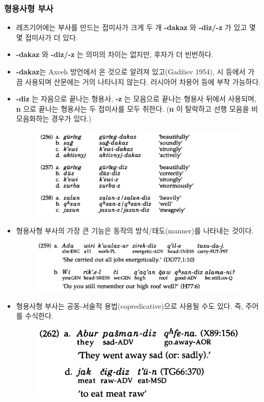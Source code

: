 \subsubsection{형용사형 부사}
\begin{itemize}
\item 레즈기어에는 부사를 만드는 접미사가 크게 두 개 \textbf{-dakaz} 와 \textbf{-diz/-z} 가 있고 몇몇 접미사가 더 있다.
\item \textbf{-dakaz} 와  \textbf{-diz/-z} 는 의미의 차이는 없지만, 후자가 더 빈번하다. 
\item \textbf{-dakaz}는 Axceh 방언에서 온 것으로 알려져 있고(Gadžiev 1954), 시 등에서 가끔 사용되며 산문에는 거의 나타나지 않는다. 러시아어 차용어 등에 부착 가능하다.
\item \textbf{-diz} 는 자음으로 끝나는 형용사, \textbf{-z} 는 모음으로 끝나는 형용사 뒤에서 사용되며, \textbf{n} 으로 끝나는 형용사는 두 접미사를 모두 취한다. (\textbf{n} 이 탈락하고 선행 모음을 비모음화하는 경우가 있다.)
\begin{figure}[H]
\centerline{\includegraphics[width=.8\linewidth]{Lezgian/src/ex8-1-2-1.png}}
\end{figure}
\item 형용사형 부사의 가장 큰 기능은 동작의 방식/태도(manner)를 나타내는 것이다.
\begin{figure}[H]
\centerline{\includegraphics[width=.8\linewidth]{Lezgian/src/ex259.png}}
\end{figure}
\item 형용사형 부사는 공동-서술적 용법(copredicative)으로 사용될 수도 있다. 즉, 주어를 수식한다.
\begin{figure}[H]
\centerline{\includegraphics[width=.5\linewidth]{Lezgian/src/ex262.png}}

\end{figure}
\end{itemize}
